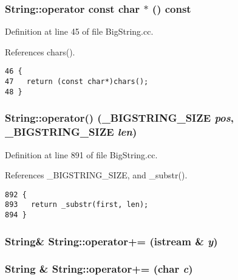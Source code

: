 \subsubsection{\setlength{\rightskip}{0pt plus 5cm}String::operator const char $\ast$ () const}\label{classString_a103}




Definition at line 45 of file Big\-String.cc.

References chars().



\footnotesize\begin{verbatim}46 { 
47   return (const char*)chars();
48 }
\end{verbatim}\normalsize 
{}
\subsubsection{ String::operator() ({\bf \_\-BIGSTRING\_\-SIZE} {\em pos}, {\bf \_\-BIGSTRING\_\-SIZE} {\em len})}\label{classString_a52}




Definition at line 891 of file Big\-String.cc.

References \_\-BIGSTRING\_\-SIZE, and \_\-substr().



\footnotesize\begin{verbatim}892 {
893   return _substr(first, len);
894 }
\end{verbatim}\normalsize 
{}
\subsubsection{\setlength{\rightskip}{0pt plus 5cm}String\& String::operator+= (istream \& {\em y})}\label{classString_a21}


\subsubsection{\setlength{\rightskip}{0pt plus 5cm}String \& String::operator+= (char {\em c})\hspace{0.3cm}{\tt  [inline]}}\label{classString_a20}




